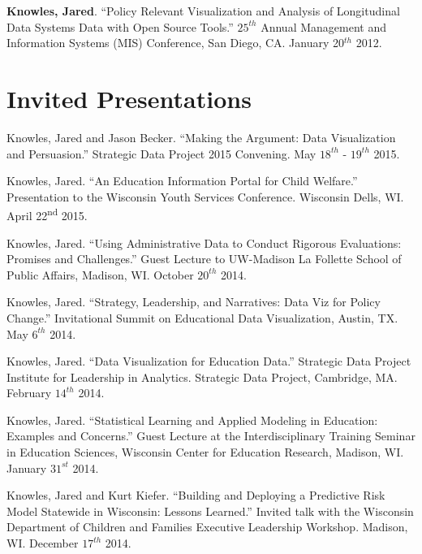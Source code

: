 \documentclass[margin,line]{res}
\begin{document}
\begin{resume}
\textbf{Knowles, Jared}. ``Policy Relevant Visualization and Analysis of Longitudinal Data Systems Data with Open Source Tools.'' $25^{th}$ Annual Management and Information Systems (MIS) Conference, San Diego, CA. January 20$^{th}$ 2012.


\section{\sc Invited Presentations}

Knowles, Jared and Jason Becker. ``Making the Argument: Data Visualization and 
Persuasion.'' Strategic Data Project 2015 Convening. May $18^{th}$ - $19^{th}$ 2015. 

Knowles, Jared. ``An Education Information Portal for Child Welfare.'' Presentation to the Wisconsin Youth Services Conference. Wisconsin Dells, WI. April 22\textsuperscript{nd} 2015.

Knowles, Jared. ``Using Administrative Data to Conduct Rigorous Evaluations: Promises and Challenges.'' Guest Lecture to UW-Madison La Follette School of Public Affairs, Madison, WI. October $20^{th}$ 2014.

Knowles, Jared. ``Strategy, Leadership, and Narratives: Data Viz for Policy Change.'' Invitational Summit on Educational Data Visualization, Austin, TX. May $6^{th}$ 2014. 

Knowles, Jared. ``Data Visualization for Education Data.'' Strategic Data Project Institute for Leadership in Analytics. Strategic Data Project, Cambridge, MA. February $14^{th}$ 2014. 

Knowles, Jared. ``Statistical Learning and Applied Modeling in Education: Examples 
and Concerns.'' Guest Lecture at the Interdisciplinary Training Seminar in Education Sciences, Wisconsin Center for Education Research, Madison, WI. January $31^{st}$ 2014.

Knowles, Jared and Kurt Kiefer. ``Building and Deploying a Predictive Risk Model Statewide in Wisconsin: Lessons Learned.'' Invited talk with the 
Wisconsin Department of Children and Families Executive Leadership Workshop. Madison, WI. December $17^{th}$ 2014.


\end{resume}
\end{document}

